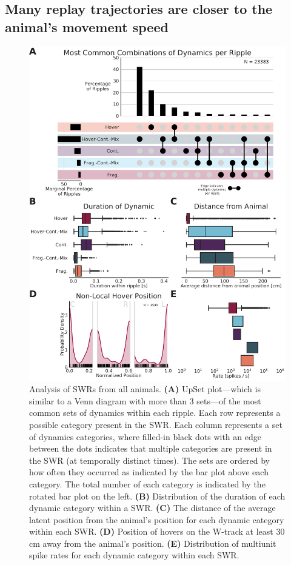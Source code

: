 \documentclass[times, twoside]{zHenriquesLab-StyleBioRxiv}
\begin{document}
\subsection*{Many replay trajectories are closer to the animal's movement speed}
\begin{figure}%
\centering
\includegraphics[width=0.80\linewidth]{figures/Figure4/Figure4_v3}
\caption{
Analysis of SWRs from all animals. \textbf{(A)} UpSet plot---which is similar to a Venn diagram with more than 3 sets---of the most common sets of dynamics within each ripple. Each row represents a possible category present in the SWR. Each column represents a set of dynamics categories, where filled-in black dots with an edge between the dots indicates that multiple categories are present in the SWR (at temporally distinct times). The sets are ordered by how often they occurred as indicated by the bar plot above each category. The total number of each category is indicated by the rotated bar plot on the left. \textbf{(B)} Distribution of the duration of each dynamic category within a SWR. \textbf{(C)} The distance of the average latent position from the animal's position for each dynamic category within each SWR. \textbf{(D)} Position of hovers on the W-track at least 30 cm away from the animal's position. \textbf{(E)} Distribution of multiunit spike rates for each dynamic category within each SWR.
}
\label{4}
\end{figure}
\end{document}
